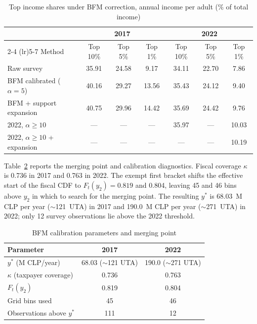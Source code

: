 \begin{table}[H]
\centering
\caption{Top income shares under BFM correction, annual income per adult (\% of total income)}
\label{tab:bfm-shares}
\small
\begin{tabular}{lcccccc}
\toprule
 & \multicolumn{3}{c}{2017} & \multicolumn{3}{c}{2022} \\
\cmidrule(lr){2-4} \cmidrule(lr){5-7}
Method & Top 10\% & Top 5\% & Top 1\% & Top 10\% & Top 5\% & Top 1\% \\
\midrule
Raw survey & 35.91 & 24.58 & 9.17 & 34.11 & 22.70 & 7.86 \\
BFM calibrated ($\alpha=5$) & 40.16 & 29.27 & 13.56 & 35.43 & 24.12 & 9.40 \\
BFM + support expansion & 40.75 & 29.96 & 14.42 & 35.69 & 24.42 & 9.76 \\
\midrule
2022, $\alpha\ge 10$ & --- & --- & --- & 35.97 & --- & 10.03 \\
2022, $\alpha\ge 10$ + expansion & --- & --- & --- & --- & --- & 10.19 \\
\bottomrule
\end{tabular}
\end{table}

Table~\ref{tab:bfm-params} reports the merging point and calibration diagnostics. Fiscal coverage $\kappa$ is 0.736 in 2017 and 0.763 in 2022. The exempt first bracket shifts the effective start of the fiscal CDF to $F_t(y_2)=0.819$ and 0.804, leaving 45 and 46 bins above $y_2$ in which to search for the merging point. The resulting $y^{*}$ is 68.03~M CLP per year ($\sim$121~UTA) in 2017 and 190.0~M CLP per year ($\sim$271~UTA) in 2022; only 12 survey observations lie above the 2022 threshold.

\begin{table}[H]
\centering
\caption{BFM calibration parameters and merging point}
\label{tab:bfm-params}
\small
\begin{tabular}{lcc}
\toprule
Parameter & 2017 & 2022 \\
\midrule
$y^{*}$ (M CLP/year) & 68.03 ($\sim$121 UTA) & 190.0 ($\sim$271 UTA) \\
$\kappa$ (taxpayer coverage) & 0.736 & 0.763 \\
$F_t(y_2)$ & 0.819 & 0.804 \\
Grid bins used & 45 & 46 \\
Observations above $y^{*}$ & 111 & 12 \\
\bottomrule
\end{tabular}
\end{table}

